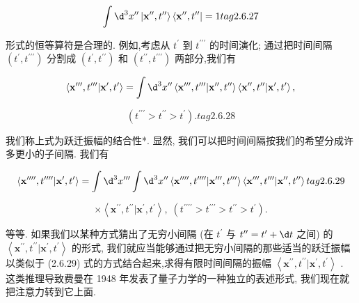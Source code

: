 \documentclass[lang=cn,newtx,10pt,scheme=chinese,thmcnt=section]{elegantbook}
\begin{document}
$$
\int {\d}^{3}{x}^{\prime \prime }\left| {{\mathbf{x}}^{\prime \prime },{t}^{\prime \prime }}\right\rangle \left\langle {{\mathbf{x}}^{\prime \prime },{t}^{\prime \prime }}\right| = 1 tag{2.6.27}
$$

形式的恒等算符是合理的. 例如,考虑从 ${t}^{\prime }$ 到 ${t}^{\prime \prime \prime }$ 的时间演化; 通过把时间间隔 $\left( {{t}^{\prime },{t}^{\prime \prime \prime }}\right)$ 分割成 $\left( {{t}^{\prime },{t}^{\prime \prime }}\right)$ 和 $\left( {{t}^{\prime \prime },{t}^{\prime \prime \prime }}\right)$ 两部分,我们有

$$
\left\langle {{\mathbf{x}}^{\prime \prime \prime },{t}^{\prime \prime \prime } | {\mathbf{x}}^{\prime },{t}^{\prime }}\right\rangle = \int {\d}^{3}{x}^{\prime \prime }\left\langle {{\mathbf{x}}^{\prime \prime \prime },{t}^{\prime \prime \prime } | {\mathbf{x}}^{\prime \prime },{t}^{\prime \prime }}\right\rangle \left\langle {{\mathbf{x}}^{\prime \prime },{t}^{\prime \prime } | {\mathbf{x}}^{\prime },{t}^{\prime }}\right\rangle ,
$$

$$
\left( {{t}^{\prime \prime \prime } > {t}^{\prime \prime } > {t}^{\prime }}\right) \text{.} tag{2.6.28}
$$

我们称上式为跃迁振幅的结合性*. 显然, 我们可以把时间间隔按我们的希望分成许多更小的子间隔. 我们有

$$
\left\langle {{\mathbf{x}}^{\prime \prime \prime \prime },{t}^{\prime \prime \prime \prime } | {\mathbf{x}}^{\prime },{t}^{\prime }}\right\rangle = \int {\d}^{3}{x}^{\prime \prime \prime }\int {\d}^{3}{x}^{\prime \prime }\left\langle {{\mathbf{x}}^{\prime \prime \prime \prime },{t}^{\prime \prime \prime \prime } | {\mathbf{x}}^{\prime \prime \prime },{t}^{\prime \prime \prime }}\right\rangle \left\langle {{\mathbf{x}}^{\prime \prime \prime },{t}^{\prime \prime \prime } | {\mathbf{x}}^{\prime \prime },{t}^{\prime \prime }}\right\rangle tag{2.6.29}
$$

$$
\times \left\langle {{\mathbf{x}}^{\prime \prime },{t}^{\prime \prime } | {\mathbf{x}}^{\prime },{t}^{\prime }}\right\rangle ,\;\left( {{t}^{\prime \prime \prime \prime } > {t}^{\prime \prime \prime } > {t}^{\prime \prime } > {t}^{\prime }}\right) .
$$

等等. 如果我们以某种方式猜出了无穷小间隔 (在 ${t}^{\prime }$ 与 ${t}^{\prime \prime } = {t}^{\prime } + {\d t}$ 之间) 的 $\left\langle {{\mathbf{x}}^{\prime \prime },{t}^{\prime \prime } | {\mathbf{x}}^{\prime },{t}^{\prime }}\right\rangle$ 的形式, 我们就应当能够通过把无穷小间隔的那些适当的跃迁振幅以类似于 (2.6.29) 式的方式结合起来,求得有限时间间隔的振幅 $\left\langle {{\mathbf{x}}^{\prime \prime },{t}^{\prime \prime } | {\mathbf{x}}^{\prime },{t}^{\prime }}\right\rangle$ . 这类推理导致费曼在 1948 年发表了量子力学的一种独立的表述形式, 我们现在就把注意力转到它上面.
\end{document}
